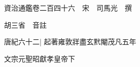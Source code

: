 






























































資治通鑑卷二百四十六　宋　司馬光　撰

胡三省　音註

唐紀六十二|{
	起著雍敦牂盡玄黓閹茂凡五年}


文宗元聖昭獻孝皇帝下


